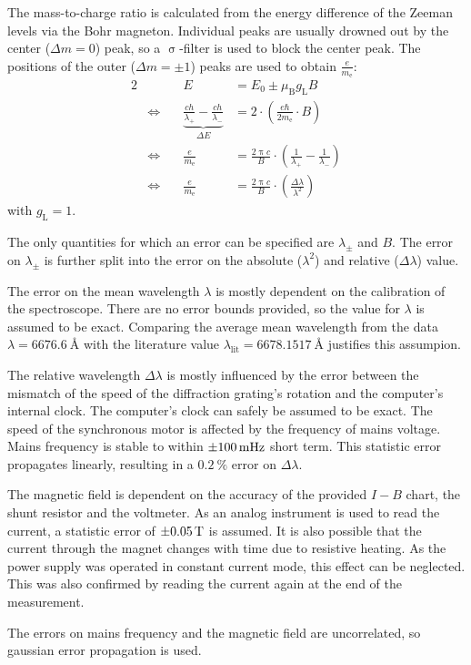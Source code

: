 The mass-to-charge ratio is calculated from the energy difference of the Zeeman levels via the Bohr magneton.
Individual peaks are usually drowned out by the center ($\Delta m = 0$) peak, so a $\upsigma$-filter is used to block the center peak.
The positions of the outer ($\Delta m = \pm 1$) peaks are used to obtain $\frac{e}{m_\text{e}}$:
\begin{alignat}{2}
	& &E &= E_0 \pm \mu_\text{B} g_\text{L} B\\
	&\Leftrightarrow \quad &\underbrace{\frac{c h}{\lambda_+} - \frac{c h}{\lambda_-}}_{\Delta E} &=
	2 \cdot \left(\frac{e \hbar}{2 m_\text{e}} \cdot B \right)\\
	&\Leftrightarrow &\frac{e}{m_\text{e}} &= \frac{2 \uppi c}{B} \cdot \left(\frac{1}{\lambda_+} - \frac{1}{\lambda_-}\right)\\
	&\Leftrightarrow &\frac{e}{m_\text{e}} &= \frac{2 \uppi c}{B} \cdot \left(\frac{\Delta \lambda}{\lambda^2}\right)
\end{alignat}
with $g_\text{L} = 1$.

The only quantities for which an error can be specified are $\lambda_\pm$ and $B$.
The error on $\lambda_\pm$ is further split into the error on the absolute ($\lambda^2$) and relative ($\Delta \lambda$) value.

The error on the mean wavelength $\lambda$ is mostly dependent on the calibration of the spectroscope.
There are no error bounds provided, so the value for $\lambda$ is assumed to be exact. 
Comparing the average mean wavelength from the data $\lambda = \SI{6676.6}{\angstrom}$ with the literature value $\lambda_\text{lit} = \SI{6678.1517}{\angstrom}$ justifies this assumpion.

The relative wavelength $\Delta \lambda$ is mostly influenced by the error between the mismatch of the speed of the diffraction grating's rotation and the computer's internal clock.
The computer's clock can safely be assumed to be exact.
The speed of the synchronous motor is affected by the frequency of mains voltage.
Mains frequency is stable to within $\SI{\pm 100}{\milli\hertz}$ short term.
This statistic error propagates linearly, resulting in a $\SI{0.2}{\percent}$ error on $\Delta\lambda$.

The magnetic field is dependent on the accuracy of the provided $I-B$ chart, the shunt resistor and the voltmeter.
As an analog instrument is used to read the current, a statistic error of $\SI{\pm 0.05}{\tesla}$ is assumed.
It is also possible that the current through the magnet changes with time due to resistive heating.
As the power supply was operated in constant current mode, this effect can be neglected.
This was also confirmed by reading the current again at the end of the measurement.

The errors on mains frequency and the magnetic field are uncorrelated, so gaussian error propagation is used. 
